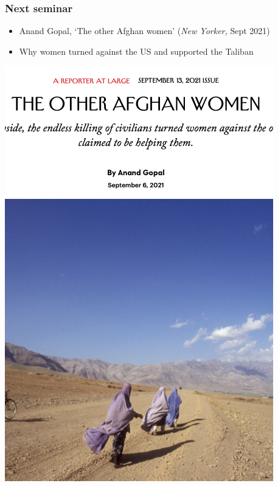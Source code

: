 \documentclass[aspectratio=43]{beamer}
\begin{document}
\begin{frame}
\frametitle{Next seminar}
\centering

\begin{minipage}{0.55\textwidth}\centering
\begin{itemize}
  \item Anand Gopal, `The other Afghan women' (\textit{New Yorker,} Sept 2021)
  \item Why women turned against the US and supported the Taliban
\end{itemize}
\end{minipage}\hfill
\begin{minipage}{0.44\textwidth}\centering
\includegraphics[width = \textwidth]{img/gopal}
\end{minipage}

\end{frame}
\end{document}
